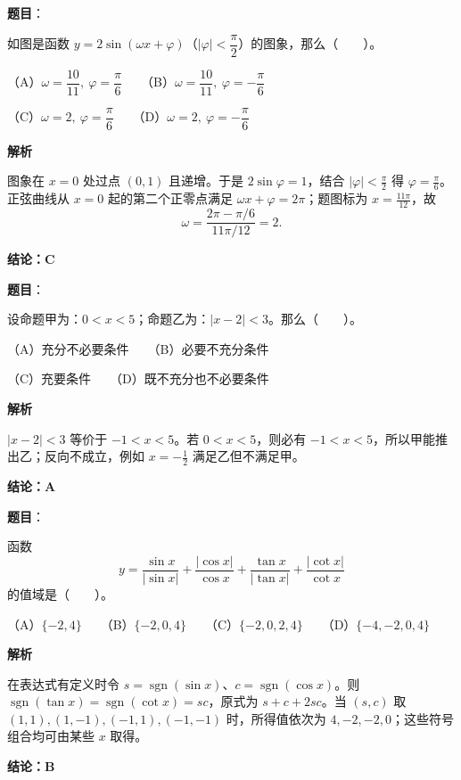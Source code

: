 \begin{answer}

\textbf{题目}：

如图是函数 $y=2\sin(\omega x+\varphi)$（$|\varphi|<\dfrac\pi2$）的图象，那么\mbox{（　　）}。
\nopagebreak[4]
\begin{center}\end{center}
\nopagebreak[4]
（A）$\omega=\dfrac{10}{11},\ \varphi=\dfrac\pi6$　　（B）$\omega=\dfrac{10}{11},\ \varphi=-\dfrac\pi6$

（C）$\omega=2,\ \varphi=\dfrac\pi6$　　（D）$\omega=2,\ \varphi=-\dfrac\pi6$

\textbf{解析}

图象在 $x=0$ 处过点 $(0,1)$ 且递增。于是 $2\sin\varphi=1$，结合 $|\varphi|<\frac\pi2$ 得 $\varphi=\frac\pi6$。正弦曲线从 $x=0$ 起的第二个正零点满足 $\omega x+\varphi=2\pi$；题图标为 $x=\frac{11\pi}{12}$，故
\nopagebreak[4]
\[
\omega=\frac{2\pi-\pi/6}{11\pi/12}=2.
\]

\textbf{结论：C}


\end{answer}
\begin{answer}

\textbf{题目}：

设命题甲为：$0<x<5$；命题乙为：$|x-2|<3$。那么\mbox{（　　）}。

（A）充分不必要条件　　（B）必要不充分条件

（C）充要条件　　（D）既不充分也不必要条件

\textbf{解析}

$|x-2|<3$ 等价于 $-1<x<5$。若 $0<x<5$，则必有 $-1<x<5$，所以甲能推出乙；反向不成立，例如 $x=-\frac12$ 满足乙但不满足甲。

\textbf{结论：A}


\end{answer}
\begin{answer}

\textbf{题目}：

函数
\nopagebreak[4]
\[
y=\frac{\sin x}{|\sin x|}+\frac{|\cos x|}{\cos x}+\frac{\tan x}{|\tan x|}+\frac{|\cot x|}{\cot x}
\]
的值域是\mbox{（　　）}。

（A）$\{-2,4\}$　　（B）$\{-2,0,4\}$　　（C）$\{-2,0,2,4\}$　　（D）$\{-4,-2,0,4\}$

\textbf{解析}

在表达式有定义时令 $s=\operatorname{sgn}(\sin x)$、$c=\operatorname{sgn}(\cos x)$。则 $\operatorname{sgn}(\tan x)=\operatorname{sgn}(\cot x)=sc$，原式为 $s+c+2sc$。当 $(s,c)$ 取 $(1,1),(1,-1),(-1,1),(-1,-1)$ 时，所得值依次为 $4,-2,-2,0$；这些符号组合均可由某些 $x$ 取得。

\textbf{结论：B}


\end{answer}
